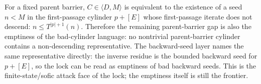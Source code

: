 \begin{theorem}
  \label{thm:collatz-bad-cylinder-language}
  \leanok
  For a fixed parent barrier, \(C\in\langle D,M\rangle\) is equivalent to the
  existence of a seed \(n<M\) in the first-passage cylinder \(p{+}[E]\) whose
  first-passage iterate does not descend: \(n\le T^{|p|+1}(n)\). Therefore the
  remaining parent-barrier gap is also the emptiness of the bad-cylinder language:
  no nontrivial parent-barrier cylinder contains a non-descending representative.
  The backward-seed layer names the same representative directly: the inverse
  residue is the bounded backward seed for \(p{+}[E]\), so the lock can be read
  as emptiness of bad backward seeds. This is the finite-state/sofic attack face
  of the lock; the emptiness itself is still the frontier.
\end{theorem}

